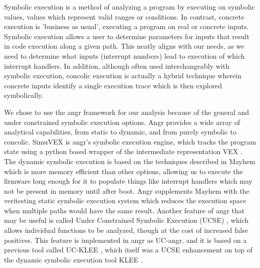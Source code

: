 \documentclass[letterpaper, 10 pt, conference]{ieeeconf}
\begin{document}
Symbolic execution \cite{jking} is a method of analyzing a program by executing on symbolic values, values which represent valid ranges or conditions. In contrast, concrete execution is 'business as usual', executing a program on real or concrete inputs. Symbolic execution allows a user to determine parameters for inputs that result in code execution along a given path. This neatly aligns with our needs, as we need to determine what inputs (interrupt numbers) lead to execution of which interrupt handlers. In addition, although often used interchangeably with symbolic execution, concolic execution \cite{ksen} is actually a hybrid technique wherein concrete inputs identify a single execution trace which is then explored symbolically. 

We chose to use the angr framework \cite{angr} for our analysis because of the general and under constrained symbolic execution options. Angr provides a wide array of analytical capabilities, from static to dynamic, and from purely symbolic to concolic. SimuVEX is angr's symbolic execution engine, which tracks the program state using a python based wrapper \cite{pyvex} of the intermediate representation VEX \cite{vex}. The dynamic symbolic execution is based on the techniques described in Mayhem \cite{mayhem} which is more memory efficient than other options, allowing us to execute the firmware long enough for it to populate things like interrupt handlers which may not be present in memory until after boot. Angr supplements Mayhem with the veritesting static symbolic execution system \cite{veritesting} which reduces the execution space when multiple paths would have the same result. Another feature of angr that may be useful is called Under Constrained Symbolic Execution (UCSE) \cite{ucklee2}, which allows individual functions to be analyzed, though at the cost of increased false positives. This feature is implemented in angr as UC-angr, and it is based on a previous tool called UC-KLEE \cite{ucklee1}, which itself was a UCSE enhancement on top of the dynamic symbolic execution tool KLEE \cite{klee}.

{}

\end{document}
